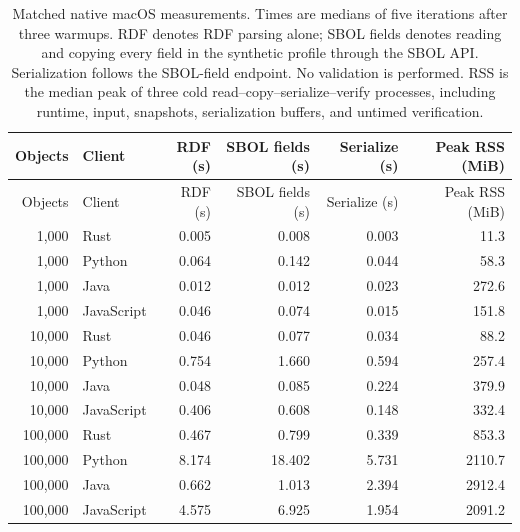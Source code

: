 \begin{longtable}{@{}rlrrrr@{}}
\caption{Matched native macOS measurements. Times are medians of five iterations after three warmups. RDF denotes RDF parsing alone; SBOL fields denotes reading and copying every field in the synthetic profile through the SBOL API. Serialization follows the SBOL-field endpoint. No validation is performed. RSS is the median peak of three cold read--copy--serialize--verify processes, including runtime, input, snapshots, serialization buffers, and untimed verification.}\label{tab:scaling-results}\\
\toprule
Objects & Client & RDF (s) & SBOL fields (s) & Serialize (s) & Peak RSS (MiB) \\
\midrule\endfirsthead
\toprule
Objects & Client & RDF (s) & SBOL fields (s) & Serialize (s) & Peak RSS (MiB) \\
\midrule\endhead
1{,}000 & Rust & 0.005 & 0.008 & 0.003 & 11.3 \\
1{,}000 & Python & 0.064 & 0.142 & 0.044 & 58.3 \\
1{,}000 & Java & 0.012 & 0.012 & 0.023 & 272.6 \\
1{,}000 & JavaScript & 0.046 & 0.074 & 0.015 & 151.8 \\
\midrule
10{,}000 & Rust & 0.046 & 0.077 & 0.034 & 88.2 \\
10{,}000 & Python & 0.754 & 1.660 & 0.594 & 257.4 \\
10{,}000 & Java & 0.048 & 0.085 & 0.224 & 379.9 \\
10{,}000 & JavaScript & 0.406 & 0.608 & 0.148 & 332.4 \\
\midrule
100{,}000 & Rust & 0.467 & 0.799 & 0.339 & 853.3 \\
100{,}000 & Python & 8.174 & 18.402 & 5.731 & 2110.7 \\
100{,}000 & Java & 0.662 & 1.013 & 2.394 & 2912.4 \\
100{,}000 & JavaScript & 4.575 & 6.925 & 1.954 & 2091.2 \\
\bottomrule
\end{longtable}
